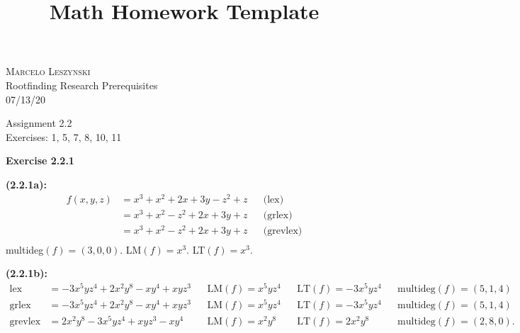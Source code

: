 \documentclass[12pt,oneside]{article}
\newenvironment{exercise}[1]{\vspace{.1in}\noindent\textbf{Exercise #1 \hspace{.05em}}}{}
\begin{document}
\title{Math Homework Template}

\begin{flushright}
\textsc{Marcelo Leszynski}  \\
Rootfinding Research Prerequisites\\
07/13/20
\end{flushright}

\begin{center}
\textsf{Assignment 2.2 } \\
\textsf{Exercises: 1, 5, 7, 8, 10, 11 }
\end{center}


\begin{exercise}{2.2.1}

    \bigskip
    \textbf{(2.2.1a):}
    \begin{align*}
        f(x,y,z)    &= x^3+x^2+2x+3y-z^2+z && \text{(lex)}\\
                    &= x^3+x^2-z^2+2x+3y+z && \text{(grlex)}\\
                    &= x^3+x^2-z^2+2x+3y+z && \text{(grevlex)}\\
    \end{align*}
    multideg$(f) = (3,0,0)$. LM$(f) = x^3$. LT$(f) = x^3$.

    \bigskip
    \textbf{(2.2.1b):}
    \begin{align*}
        \text{lex}      &= -3x^5yz^4+2x^2y^8-xy^4+xyz^3 && \text{LM}(f)=x^5yz^4 && \text{LT}(f) = -3x^5yz^4 && \text{multideg}(f)=(5,1,4)\\
        \text{grlex}    &= -3x^5yz^4+2x^2y^8-xy^4+xyz^3 && \text{LM}(f)=x^5yz^4 && \text{LT}(f) = -3x^5yz^4 && \text{multideg}(f)=(5,1,4)\\
        \text{grevlex}  &= 2x^2y^8-3x^5yz^4+xyz^3-xy^4  && \text{LM}(f)=x^2y^8  && \text{LT}(f) = 2x^2y^8   && \text{multideg}(f)=(2,8,0).
    \end{align*}
\end{exercise}

\end{document}
